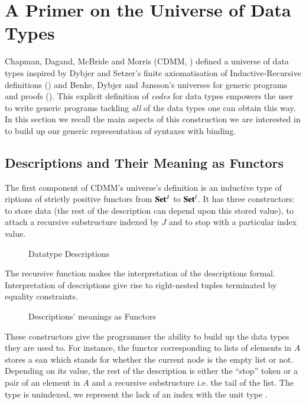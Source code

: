 \chapter{A Primer on the Universe of Data Types}\label{section:data}

Chapman, Dagand, McBride and Morris (CDMM, \citeyear{Chapman:2010:GAL:1863543.1863547})
defined a universe of data types inspired by Dybjer and Setzer's
finite axiomatisation of Inductive-Recursive definitions (\citeyear{Dybjer1999})
and Benke, Dybjer and Jansson's universes for generic programs and proofs
(\citeyear{benke-ugpp}).
This explicit definition of \emph{codes} for data types empowers the
user to write generic programs tackling \emph{all} of the data types
one can obtain this way. In this section we recall the main aspects
of this construction we are interested in to build up our generic
representation of syntaxes with binding.

\section{Descriptions and Their Meaning as Functors}

The first component of CDMM's universe's definition is an inductive type
of riptions of strictly positive functors from $\mathbf{Set}{}^J$ to
$\mathbf{Set}{}^I$. It has three constructors:  to store data (the rest of
the description can depend upon this stored value),  to attach a
recursive substructure indexed by $J$ and  to stop with a particular
index value.

\begin{figure}[h]
\caption{Datatype Descriptions\label{fig:datades}}
\end{figure}


The recursive function  makes the interpretation of the descriptions
formal. Interpretation of descriptions give rise to right-nested tuples
terminated by equality constraints.

\begin{figure}[h]
\caption{Descriptions' meanings as Functors\label{fig:datadescmeaning}}
\end{figure}

These constructors give the programmer the ability to build up the data
types they are used to. For instance, the functor corresponding
to lists of elements in $A$ stores a ean which stands for whether
the current node is the empty list or not. Depending on its value, the
rest of the description is either the ``stop'' token or a pair of an element
in $A$ and a recursive substructure i.e. the tail of the list. The  type
is unindexed, we represent the lack of an index with the unit type \AD{$\top$}.

